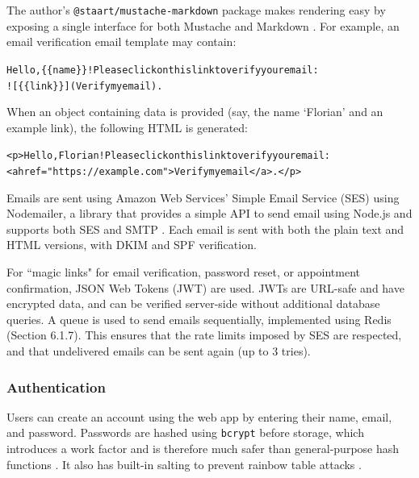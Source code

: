 \documentclass{article}
\begin{document}
The author's \texttt{@staart/mustache-markdown} package makes rendering easy by exposing a single interface for both Mustache and Markdown \cite{noauthor_staart/mustache-markdown_nodate}. For example, an email verification email template may contain:

\begin{alltt}
Hello, \textcolor{variable}{\{\{name\}\}}! Please click on this link to verify your email:
![\textcolor{variable}{\{\{link\}\}}](Verify my email).
\end{alltt}

When an object containing data is provided (say, the name `Florian' and an example link), the following HTML is generated:

\begin{alltt}
\textcolor{variable}{<p>}Hello, Florian! Please click on this link to verify your email:
\textcolor{variable}{<a href=}\textcolor{string}{"https://example.com"}\textcolor{variable}{>}Verify my email\textcolor{variable}{</a>}.\textcolor{variable}{</p>}
\end{alltt}

Emails are sent using Amazon Web Services' Simple Email Service (SES) using Nodemailer, a library that provides a simple API to send email using Node.js and supports both SES and SMTP \cite{noauthor_nodemailer_nodate}. Each email is sent with both the plain text and HTML versions, with DKIM and SPF verification.

For ``magic links" for email verification, password reset, or appointment confirmation, JSON Web Tokens (JWT) are used. JWTs are URL-safe and have encrypted data, and can be verified server-side without additional database queries. A queue is used to send emails sequentially, implemented using Redis (Section 6.1.7). This ensures that the rate limits imposed by SES are respected, and that undelivered emails can be sent again (up to 3 tries).

\subsubsection{Authentication}

Users can create an account using the web app by entering their name, email, and password. Passwords are hashed using \texttt{bcrypt} before storage, which introduces a work factor and is therefore much safer than general-purpose hash functions \cite{provos_future-adaptive_1999}. It also has built-in salting to prevent rainbow table attacks \cite{noauthor_how_2010}.
\end{document}

